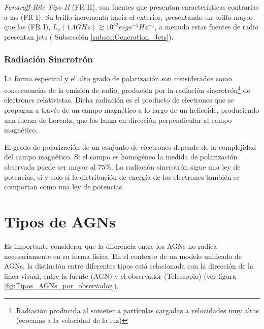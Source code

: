 {\it{Fanaroff-Rile Tipo II}} (FR II), son fuentes que presentan características contrarias a las (FR I). Su brillo incrementa hacia el exterior, presentando un brillo mayor que las (FR I), $L_{\nu}(1.4GHz)\gtrsim 10^{32} ergs^{-1}Hz^{-1}$, a menudo estas fuentes de radio presentan jets ( Subsección \ref{subsec:Generation_Jets}).



	\subsubsection{Radiación Sincrotrón}
	\label{subsubsec: Radiation_synchrotron}

La forma espectral y el alto grado de polarización son considerados como consecuencias de la emisión de radio, producida por la radiación sincrotrón\footnote{Radiación producida al someter a partículas cargadas a velocidades muy altas (cercanas a la velocidad de la luz) } de electrones relativistas. Dicha radiación es  el producto de electrones que se propagan a través de un campo magnético a lo largo de un helicoide, produciendo una fuerza de Lorentz, que los lanza en dirección perpendicular al campo magnético. 

El grado de polarización de un conjunto de electrones depende de la complejidad del campo magnético. Si el campo es homogéneo la medida de polarización observada puede ser mayor al $75\%$. La radiación sincrotrón sigue una ley de potencias, sí y solo sí  la distribución de energía de los electrones también se comportan como una ley de potencias. 


\section{Tipos de AGNs}
\label{sec: Zoo_AGN's}

Es importante considerar que la diferencia entre los AGNs no radica necesariamente en su forma física. En el contexto de un modelo unificado de AGNs, la distinción entre diferentes tipos está relacionada 
con la dirección de la linea visual, entre la fuente (AGN) y el observador (Telescopio) (ver figura \ref{fig:Tipos_AGNs_por_observador}).


